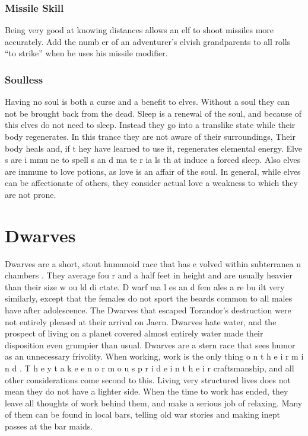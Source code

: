 \begin{multicols*}{2}
\subsubsection{Missile Skill}
Being very good at knowing distances allows an elf
to shoot missiles more accurately. Add the numb er of an
adventurer’s elvish grandparents to all rolls “to strike” when
he uses his missile modifier.
\subsubsection{Soulless}
Having no soul is both a curse and a benefit to
elves. Without a soul they can not be brought back from the
dead. Sleep is a renewal of the soul, and because of this elves
do not need to sleep. Instead they go into a translike state
while their body regenerates. In this trance they are not aware
of their surroundings, Their body heals and, if t hey have
learned to use it, regenerates elemental energy.
Elve s are i mmu ne to spell s an d ma te r ia ls th at
induce a forced sleep. Also elves are immune to love potions,
as love is an affair of the soul. In general, while elves can be
affectionate of others, they consider actual love a weakness to
which they are not prone.
\section{Dwarves}
Dwarves are a short, stout humanoid race that has
e volved within subterranea n chambers . They average fou r
and a half feet in height and are usually heavier than their size
w ou ld di ctate. D warf ma l es an d fem ales a re bu ilt very
similarly, except that the females do not sport the beards
common to all males have after adolescence.
The Dwarves that escaped Torandor’s destruction
were not entirely pleased at their arrival on Jaern. Dwarves
hate water, and the prospect of living on a planet covered
almost entirely water made their disposition even grumpier
than usual.
Dwarves are a stern race that sees humor as an
unnecessary frivolity. When working, work is the only thing
o n t h e i r m i n d . T h e y t a k e e n o r m o u s p r i d e i n t h e i r
craftsmanship, and all other considerations come second to
this.
Living very structured lives does not mean they do
not have a lighter side. When the time to work has ended,
they leave all thoughts of work behind them, and make a
serious job of relaxing. Many of them can be found in local
bars, telling old war stories and making inept passes at the bar
maids.

\end{multicols*}
